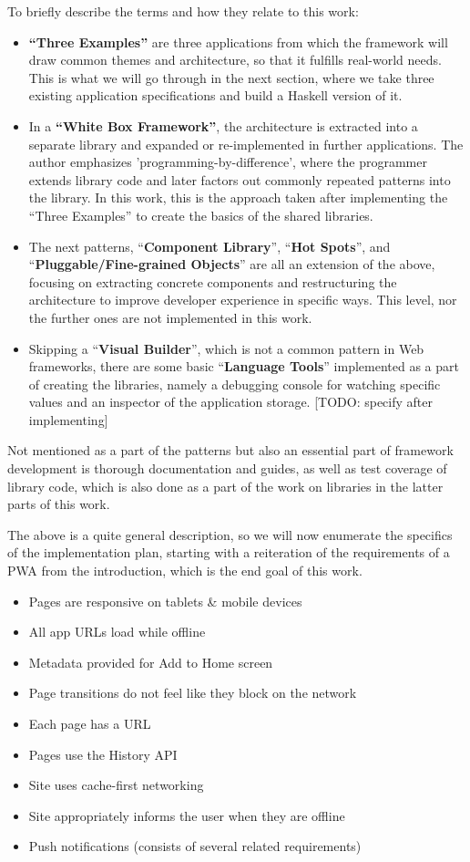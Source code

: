 \documentclass[english,odsaz]{fitthesis}
\begin{document}
To briefly describe the terms and how they relate to this work:
\begin{itemize}
\item \textbf{``Three Examples''} are three applications from which the framework will
draw common themes and architecture, so that it fulfills real-world needs. This
is what we will go through in the next section, where we take three existing
application specifications and build a Haskell version of it.
\item In a \textbf{``White Box Framework''}, the architecture is extracted into a separate
library and expanded or re-implemented in further applications. The author
emphasizes 'programming-by-difference', where the programmer extends library
code and later factors out commonly repeated patterns into the library. In
this work, this is the approach taken after implementing the ``Three Examples''
to create the basics of the shared libraries.
\item The next patterns, ``\textbf{Component Library}'', ``\textbf{Hot Spots}'', and
``\textbf{Pluggable/Fine-grained Objects}'' are all an extension of the above, focusing
on extracting concrete components and restructuring the architecture to
improve developer experience in specific ways. This level, nor the further
ones are not implemented in this work.
\item Skipping a ``\textbf{Visual Builder}'', which is not a common pattern in Web frameworks,
there are some basic ``\textbf{Language Tools}'' implemented as a part of creating the
libraries, namely a debugging console for watching specific values and an
inspector of the application storage. [TODO: specify after implementing]
\end{itemize}

Not mentioned as a part of the patterns but also an essential part of framework
development is thorough documentation and guides, as well as test coverage of
library code, which is also done as a part of the work on libraries in the
latter parts of this work.

The above is a quite general description, so we will now enumerate the specifics of the
implementation plan, starting with a reiteration of the requirements of a PWA
from the introduction, which is the end goal of this work.

\begin{itemize}
\item Pages are responsive on tablets \& mobile devices
\item All app URLs load while offline
\item Metadata provided for Add to Home screen
\item Page transitions do not feel like they block on the network
\item Each page has a URL
\item Pages use the History API
\item Site uses cache-first networking
\item Site appropriately informs the user when they are offline
\item Push notifications (consists of several related requirements)
\end{itemize}
\end{document}
